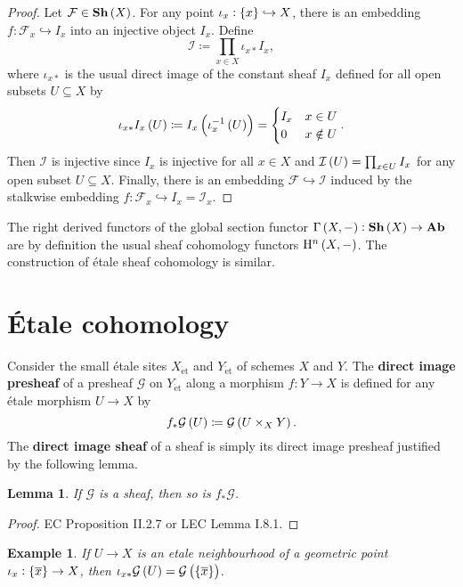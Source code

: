 \documentclass{article}
\newtheorem*{example}{Example}
\newtheorem*{lemma}{Lemma}
\newcommand{\Ab}{\mathbf{Ab}}
\newcommand{\br}{\del}
\newcommand{\et}{\mathrm{\acute{e}t}}
\newcommand{\F}{\mathcal{F}}
\newcommand{\G}{\mathcal{G}}
\renewcommand{\H}{\mathrm{H}}
\newcommand{\I}{\mathcal{I}}
\newcommand{\Sh}{\mathbf{Sh}}
\begin{document}
\begin{proof}
Let $ \F \in \Sh\br{X} $. For any point $ \iota_x : \cbr{x} \hookrightarrow X $, there is an embedding $ f : \F_x \hookrightarrow I_x $ into an injective object $ I_x $. Define
$$ \I \coloneqq \prod_{x \in X} \iota_{x*}I_x, $$
where $ \iota_{x*} $ is the usual direct image of the constant sheaf $ I_x $ defined for all open subsets $ U \subseteq X $ by
$$ \iota_{x*}I_x\br{U} \coloneqq I_x\br{\iota_x^{-1}\br{U}} =
\begin{cases}
I_x & x \in U \\
0 & x \notin U
\end{cases}.
$$
Then $ \I $ is injective since $ I_x $ is injective for all $ x \in X $ and $ \I\br{U} = \prod_{x \in U} I_x $ for any open subset $ U \subseteq X $. Finally, there is an embedding $ \F \hookrightarrow \I $ induced by the stalkwise embedding $ f : \F_x \hookrightarrow I_x = \I_x $.
\end{proof}

The right derived functors of the global section functor $ \Gamma\br{X, -} : \Sh\br{X} \to \Ab $ are by definition the usual sheaf cohomology functors $ \H^n\br{X, -} $. The construction of \'etale sheaf cohomology is similar.

\pagebreak

\section{\'Etale cohomology}

Consider the small \'etale sites $ X_\et $ and $ Y_\et $ of schemes $ X $ and $ Y $. The \textbf{direct image presheaf} of a presheaf $ \G $ on $ Y_\et $ along a morphism $ f : Y \to X $ is defined for any \'etale morphism $ U \to X $ by
$$ f_*\G\br{U} \coloneqq \G\br{U \times_X Y}. $$
The \textbf{direct image sheaf} of a sheaf is simply its direct image presheaf justified by the following lemma.

\begin{lemma}
If $ \G $ is a sheaf, then so is $ f_*\G $.
\end{lemma}

\begin{proof}
EC Proposition II.2.7 or LEC Lemma I.8.1.
\end{proof}

\begin{example}
If $ U \to X $ is an etale neighbourhood of a geometric point $ \iota_x : \cbr{\overline{x}} \to X $, then $ \iota_{x*}\G\br{U} = \G\br{\cbr{\overline{x}}} $.
\end{example}
\end{document}
